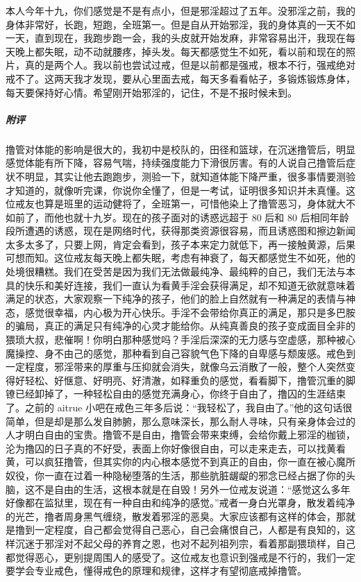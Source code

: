 \begin{case}
    本人今年十九，你们感觉是不是有点小，但是邪淫超过了五年。没邪淫之前，我的身体非常好，长跑，短跑，全班第一。但是自从开始邪淫，我的身体真的一天不如一天，直到现在，我跑步跑一会，我的头皮就开始发麻，非常容易出汗，我现在每天晚上都失眠，动不动就腰疼，掉头发。每天都感觉生不如死，看以前和现在的照片，真的是两个人。我以前也尝试过戒，但是以前都是强戒，根本不行，强戒绝对戒不了。这两天我才发现，要从心里面去戒，每天多看看帖子，多锻炼锻炼身体，每天要保持好心情。希望刚开始邪淫的，记住，不是不报时候未到。
    \subparagraph{附评} 撸管对体能的影响是很大的，我初中是校队的，田径和篮球，在沉迷撸管后，明显感觉体能有所下降，容易气喘，持续强度能力下滑很厉害。有的人说自己撸管后症状不明显，其实让他去跑跑步，测验一下，就知道体能下降严重，很多事情要测验才知道的，就像听完课，你说你全懂了，但是一考试，证明很多知识并未真懂。这位戒友也算是班里的运动健将了，全班第一，可惜他染上了撸管恶习，身体就大不如前了，而他也就十九岁。现在的孩子面对的诱惑远超于 80 后和 80 后相同年龄段所遭遇的诱惑，现在是网络时代，获得那类资源很容易，而且诱惑图和擦边新闻太多太多了，只要上网，肯定会看到，孩子本来定力就低下，再一接触黄源，后果可想而知。这位戒友每天晚上都失眠，考虑有神衰了，每天都感觉生不如死，他的处境很糟糕。我们在受苦是因为我们无法做最纯净、最纯粹的自己，我们无法与本具的快乐和美好连接，我们一直认为看黄手淫会获得满足，却不知道无欲就意味着满足的状态，大家观察一下纯净的孩子，他们的脸上自然就有一种满足的表情与神态，感觉很幸福，内心极为开心快乐。手淫不会带给你真正的满足，那只是多巴胺的骗局，真正的满足只有纯净的心灵才能给你。从纯真善良的孩子变成面目全非的猥琐大叔，悲催啊！你明白那种感觉吗？手淫后深深的无力感与空虚感，那种被心魔操控、身不由己的感觉，那种看到自己容貌气色下降的自卑感与颓废感。戒色到一定程度，邪淫带来的厚重与压抑就会消失，就像乌云消散了一般，整个人突然变得好轻松、好惬意、好明亮、好清澈，如释重负的感觉，看看脚下，撸管沉重的脚镣已经卸掉了，一种轻松自由的感觉充满身心，你终于自由了，撸囚的生涯结束了。之前的 aitrue 小吧在戒色三年多后说：“我轻松了，我自由了。”他的这句话很简单，但是却是那么发自肺腑，那么意味深长，那么耐人寻味，只有亲身体会过的人才明白自由的宝贵。撸管不是自由，撸管会带来束缚，会给你戴上邪淫的枷锁，沦为撸囚的日子真的不好受，表面上你好像很自由，可以走来走去，可以找黄看黄，可以疯狂撸管，但其实你的内心根本感觉不到真正的自由，你一直在被心魔所奴役，你一直在过着一种隐秘堕落的生活，那些肮脏龌龊的邪念已经占据了你的头脑，这不是自由的生活，这根本就是在自毁！另外一位戒友说道：“感觉这么多年好像都在监狱里，现在有一种自由和纯净的感觉。”戒者一身白光罩身，散发着纯净的光芒，撸者周身黑气缠绕，散发着邪淫的恶臭。大家应该都有这样的体会，那就是撸到一定程度，自己都会觉得自己恶心，自己会痛恨自己，人都是有良知的，这样沉迷于邪淫对不起父母的养育之恩，也对不起列祖列宗，看着那副猥琐样，自己都觉得恶心，更别提周围人的感受了。这位戒友也意识到强戒是不行的，我们一定要学会专业戒色，懂得戒色的原理和规律，这样才有望彻底戒掉撸管。
\end{case}

